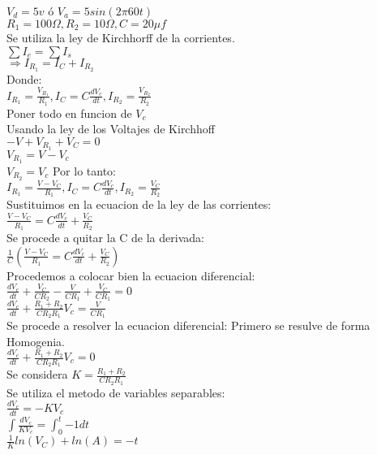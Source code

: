 \documentclass[12pt]{article}
\newcommand{\derivada}[2]{\displaystyle{\frac{d#1}{d#2}}}
\newcommand{\integral}[4]{\displaystyle{\int_{#1}^{#2}{#3}{#4}}}
\newcommand{\fraccion}[2]{\displaystyle{\frac{#1}{#2}}}
\begin{document}
$V_d=5v$ \'o $V_a=5sin(2\pi60t) $\\
$R_1=100 \Omega, R_2=10 \Omega, C=20\mu f $\\
Se utiliza la ley de Kirchhorff de la corrientes.\\
$\sum I_e=\sum I_s$\\
$\Rightarrow I_{R_1}= I_C + I_{R_2}$\\
Donde:\\
\bigskip
$I_{R_1}=\fraccion{V_{R_1}}{R_1},I_C=C\derivada{V_c}{t} ,I_{R_2}=\fraccion{V_{R_2}}{R_2} $\\
\bigskip
Poner todo en funcion de $V_c$\\
Usando la ley de los Voltajes de Kirchhoff\\
$-V+V_{R_1}+V_C=0$\\
$V_{R_1}=V-V_c$\\
$V_{R_2}=V_c$
Por lo tanto:\\
\bigskip
$I_{R_1}=\fraccion{V-V_C}{R_1}, I_C=C\derivada{V_c}{t} , I_{R_2}=\fraccion{V_C}{R_2} $\\
\bigskip
Sustituimos en la ecuacion de la ley de las corrientes:\\
\bigskip
$\fraccion{V-V_C}{R_1}=C\derivada{V_c}{t} +\fraccion{V_C}{R_2} $\\
\bigskip
Se procede a quitar la C de la derivada:\\
\bigskip
$\fraccion{1}{C}(\fraccion{V-V_C}{R_1}=C\derivada{V_c}{t} +\fraccion{V_C}{R_2}) $\\
\bigskip
Procedemos a colocar bien la ecuacion diferencial: \\
\bigskip
$\derivada{V_c}{t} +\fraccion{V_C}{CR_2}- \fraccion{V}{CR_1}+\fraccion{V_C}{CR_1}=0 $\\
\bigskip
\bigskip
$\derivada{V_c}{t} +\fraccion{R_1+R_2}{CR_2R_1}V_c=\fraccion{V}{CR_1} $\\
\bigskip
Se procede a resolver la ecuacion diferencial:
Primero se resulve de forma Homogenia.\\
\bigskip
$\derivada{V_c}{t} +\fraccion{R_1+R_2}{CR_2R_1} V_c=0 $\\
\bigskip
Se considera $K=\fraccion{R_1+R_2}{CR_2R_1}$\\
\bigskip
Se utiliza el metodo de variables separables:\\
\bigskip
$\derivada{V_c}{t} =-K V_c $\\
\bigskip
$\int \fraccion{dV_c}{KV_c}=\integral{0}{t}{-1}{dt}$\\
\bigskip
$\fraccion{1}{K} ln(V_C)+ln(A)=-t$\\
\end{document}
